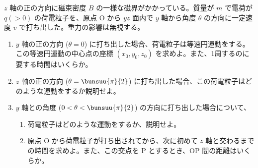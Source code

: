 \item
    \begin{mawarikomi}{120pt}{
        
    }
$z$ 軸の正の方向に磁束密度 $B$ の一様な磁界がかかっている。質量が $m$ で電荷が $q(>0)$ の荷電粒子を、原点 $\mathrm{O}$ から $yz$ 面内で $y$ 軸から角度 $\theta$ の方向に一定速度 $v$ で打ち出した。重力の影響は無視する。

    \begin{enumerate}
        \item $y$ 軸の正の方向 ($\theta=0$) に打ち出した場合、荷電粒子は等速円運動をする。この等速円運動の中心点の座標 $(x_0, y_0, z_0)$ を求めよ。また、1周するのに要する時間はいくらか。
        \item $z$ 軸の正の方向 ($\theta=\bunsuu{\pi}{2}$) に打ち出した場合、この荷電粒子はどのような運動をするか説明せよ。
        \item $y$ 軸との角度 ($0<\theta<\bunsuu{\pi}{2}$) の方向に打ち出した場合について、
        \begin{enumerate}
            \item 荷電粒子はどのような運動をするか、説明せよ。
            \item 原点 $\mathrm{O}$ から荷電粒子が打ち出されてから、次に初めて $z$ 軸と交わるまでの時間を求めよ。また、この交点を $\mathrm{P}$ とするとき、$\mathrm{OP}$ 間の距離はいくらか。
        \end{enumerate}
    \end{enumerate}
\end{mawarikomi}
